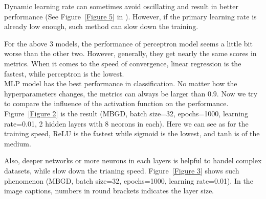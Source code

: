 \documentclass{article}
\begin{document}
Dynamic learning rate can sometimes avoid oscillating and result in better
performance (See Figure~\ref{Figure 5} in ). However, if the primary
learning rate is already low enough, such method can slow down the training.

For the above 3 models, the performance of perceptron model seems a little bit worse than
the other two. However, generally, they get nearly the same scores in metrics. When it
comes to the speed of convergence, linear regression is the fastest, while perceptron is
the lowest. \\

MLP model has the best performance in classification. No matter how the hyperparameters
changes, the metrics can always be larger than $0.9$. Now we try to compare the
influence of the activation function on the performance. Figure~\ref{Figure 2} is the result
(MBGD, batch size=32, epochs=1000, learning rate=0.01, 2 hidden layers with 8 neorons in each).
Here we can see as for the training speed, ReLU is the fastest while sigmoid is the lowest,
and tanh is of the medium.

Also, deeper networks or more neurons in each layers is helpful to handel complex
datasets, while slow down the trianing speed. Figure~\ref{Figure 3} shows such
phenomenon (MBGD, batch size=32, epochs=1000, learning rate=0.01). In the image
captions, numbers in round brackets indicates the layer size.
\end{document}
